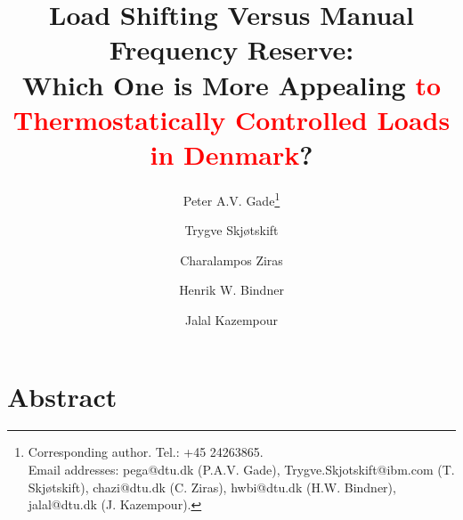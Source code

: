 \documentclass[11pt,a4paper]{article}
\date{}
\begin{document}
\title{
    Load Shifting Versus Manual Frequency Reserve: \\ Which One is More Appealing \textcolor{red}{to Thermostatically Controlled Loads in Denmark}?
}
\author[1,2]{Peter A.V. Gade\footnote{Corresponding author. Tel.: +45 24263865. \\ Email addresses: pega@dtu.dk (P.A.V. Gade), Trygve.Skjotskift@ibm.com (T. Skjøtskift), chazi@dtu.dk (C. Ziras), hwbi@dtu.dk (H.W. Bindner), jalal@dtu.dk (J. Kazempour).}}
\author[2]{Trygve Skjøtskift}
\author[1]{Charalampos Ziras}
\author[1]{Henrik W. Bindner}
\author[1]{Jalal Kazempour}
\renewcommand\Affilfont{\itshape\small}

{\let\newpage\relax\maketitle}


\section*{Abstract}
\end{document}
